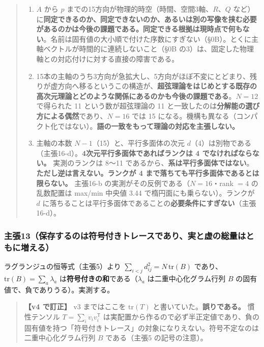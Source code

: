 \documentclass[
  10pt,
]{ltjsarticle}
\providecommand{\tightlist}{%
  \setlength{\itemsep}{0pt}\setlength{\parskip}{0pt}}
\begin{document}
\begin{quote}
\begin{enumerate}
\def\labelenumi{\arabic{enumi}.}
\tightlist
\item
  \(A\) から \(p\) までの15方向が物理的時空（時間、空間3軸、\(R\)、\(Q\)
  など）に\textbf{同定できるのか、同定できないのか、あるいは別の写像を挟む必要があるのかは今後の課題である。同定できる根拠は現時点で何もない}。名前は固有値の大小順で付けた序数にすぎない（§0B）。とくに主軸ベクトルが時間的に連続しないこと（§0B
  の3）は、固定した物理軸との対応付けに対する直接の障害である。
\item
  15本の主軸のうち3方向が急拡大し、5方向がほぼ不変にとどまり、残りが虚方向へ移るというこの構造が、\textbf{超弦理論をはじめとする既存の高次元理論とどのような関係にあるのかも今後の課題である}。\(N=12\)
  で得られた 11 という数が超弦理論の 11
  と一致したのは\textbf{分解能の選び方による偶然}であり、\(N=16\) では
  15
  になる。機構も異なる（コンパクト化ではない）。\textbf{語の一致をもって理論の対応を主張しない。}
\item
  主軸の本数 \(N-1\)（15）と、平行多面体の次元
  \(d\)（4）は別物である（主張16-d）。\textbf{4次元平行多面体であればランクは
  4 でなければならない。} 実測のランクは 8〜11
  であるから、\textbf{系は平行多面体ではない}。
  \textbf{ただし逆は言えない。ランクが 4
  まで落ちても平行多面体であるとは限らない。} 主張16-b
  の実測がその反例である（\(N=16\)・rank \(=4\) の乱数配置は max/min
  中央値 3.44 で楕円面にも乗らない）。ランクが \(d\)
  に落ちることは平行多面体であることの\textbf{必要条件にすぎない}（主張16-d）。
\end{enumerate}
\end{quote}

\subsubsection{主張13（保存するのは符号付きトレースであり、実と虚の総量はともに増える）}\label{ux4e3bux5f3513ux4fddux5b58ux3059ux308bux306eux306fux7b26ux53f7ux4ed8ux304dux30c8ux30ecux30fcux30b9ux3067ux3042ux308aux5b9fux3068ux865aux306eux7dcfux91cfux306fux3068ux3082ux306bux5897ux3048ux308b}

ラグランジュの恒等式（主張5）より
\(\sum_{i<j} d_{ij}^2 = N\,\mathrm{tr}(B)\)
であり、\(\mathrm{tr}(B) = \sum_a \lambda_a\)
は\textbf{符号付きの和}である（\(\lambda_a\) は二重中心化グラム行列
\(B\) の固有値で、負でありうる）。実測する。

\begin{quote}
\textbf{【v4 で訂正】} v3 まではここを \(\mathrm{tr}(T)\)
と書いていた。\textbf{誤りである。} 慣性テンソル
\(T=\sum_i v_iv_i^{\mathsf T}\)
は実配置から作るので必ず半正定値であり、負の固有値を持つ「符号付きトレース」の対象になりえない。符号不定なのは二重中心化グラム行列
\(B\) である（主張5 の記号の注意）。
\end{quote}
\end{document}
